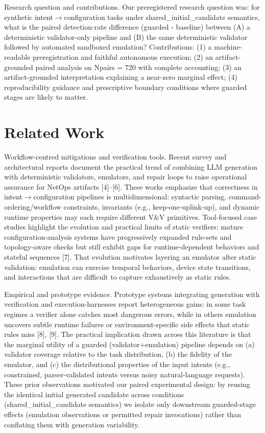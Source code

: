 \documentclass[conference]{IEEEtran}
\begin{document}
Research question and contributions. Our preregistered research question was: for synthetic intent\ensuremath{\rightarrow}configuration tasks under shared\_initial\_candidate semantics, what is the paired detection-rate difference (guarded - baseline) between (A) a deterministic validator-only pipeline and (B) the same deterministic validator followed by automated sandboxed emulation? Contributions: (1) a machine-readable preregistration and faithful autonomous execution; (2) an artifact-grounded paired analysis on Npairs = 720 with complete accounting; (3) an artifact-grounded interpretation explaining a near-zero marginal effect; (4) reproducibility guidance and prescriptive boundary conditions where guarded stages are likely to matter.

\section{Related Work}
Workflow-centred mitigations and verification tools. Recent survey and architectural reports document the practical trend of combining LLM generation with deterministic validators, emulators, and repair loops to raise operational assurance for NetOps artifacts [4]--[6]. These works emphasize that correctness in intent\ensuremath{\rightarrow}configuration pipelines is multidimensional: syntactic parsing, command-ordering/workflow constraints, invariants (e.g., keep‑one‑uplink‑up), and dynamic runtime properties may each require different V\&V primitives. Tool-focused case studies highlight the evolution and practical limits of static verifiers: mature configuration-analysis systems have progressively expanded rule-sets and topology-aware checks but still exhibit gaps for runtime-dependent behaviors and stateful sequences [7]. That evolution motivates layering an emulator after static validation: emulation can exercise temporal behaviors, device state transitions, and interactions that are difficult to capture exhaustively as static rules.

Empirical and prototype evidence. Prototype systems integrating generation with verification and execution-harnesses report heterogeneous gains: in some task regimes a verifier alone catches most dangerous errors, while in others emulation uncovers subtle runtime failures or environment-specific side effects that static rules miss [8], [9]. The practical implication drawn across this literature is that the marginal utility of a guarded (validator+emulation) pipeline depends on (a) validator coverage relative to the task distribution, (b) the fidelity of the emulator, and (c) the distributional properties of the input intents (e.g., constrained, parser-validated intents versus noisy natural-language requests). These prior observations motivated our paired experimental design: by reusing the identical initial generated candidate across conditions (shared\_initial\_candidate semantics) we isolate only downstream guarded-stage effects (emulation observations or permitted repair invocations) rather than conflating them with generation variability.
\end{document}
